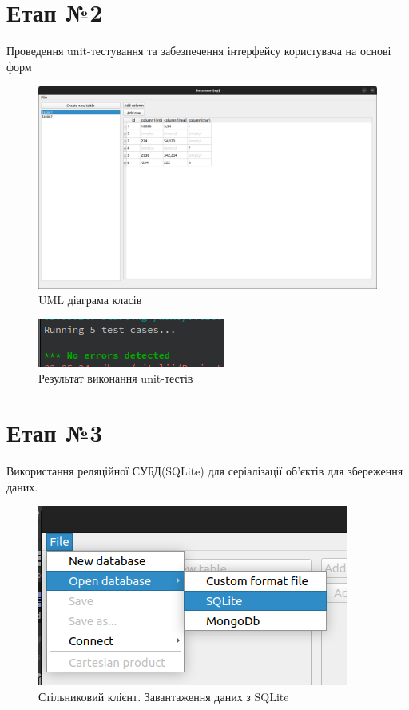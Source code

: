 \documentclass[a4paper, 12pt]{article}
\begin{document}
\section{Етап №2}
Проведення unit-тестування та забезпечення інтерфейсу користувача на основі форм

\begin{figure}[H]
\centering
\includegraphics[scale=0.3]{resources/DesktopWindow.png}
\caption{UML діаграма класів}
\end{figure}

\begin{figure}[H]
\centering
\includegraphics[scale=0.8]{resources/UnitTests.png}
\caption{Результат виконання unit-тестів}
\end{figure}

\section{Етап №3}
Використання реляційної СУБД(SQLite) для серіалізації об'єктів для збереження даних.
 
\begin{figure}[H]
\centering
\includegraphics[scale=0.8]{resources/SQLiteLoadMenu.png}
\caption{Стільниковий клієнт. Завантаження даних з SQLite}
\end{figure} 
\end{document}
